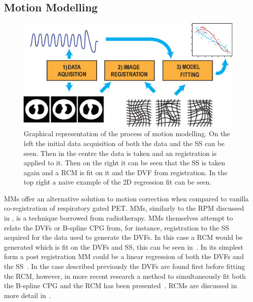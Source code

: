         \subsection{Motion Modelling} \label{sec:motion_modelling}
            \begin{figure}
                \centering
                        
                \includegraphics[width=1.0\linewidth]{figures/background_motion_model.png}
                        
                \captionsetup{singlelinecheck=false, justification=raggedright}
                \caption{Graphical representation of the process of motion modelling. On the left the initial data acquisition of both the data and the \gls{SS} can be seen. Then in the centre the data is taken and an registration is applied to it. Then on the right it can be seen that the \gls{SS} is taken again and a \gls{RCM} is fit on it and the \gls{DVF} from registration. In the top right a naive example of the \gls{2D} regression fit can be seen.} \label{fig:motion_modelling_motion_model}
            \end{figure}
            
            \glspl{MM} offer an alternative solution to motion correction when compared to vanilla co-registration of respiratory gated \gls{PET}. \glspl{MM}, similarly to the \gls{RPM} discussed in , is a technique borrowed from radiotherapy. \glspl{MM} themselves attempt to relate the \glspl{DVF} or B-spline \gls{CPG} from, for instance, registration to the \gls{SS} acquired for the data used to generate the \glspl{DVF}. In this case a \gls*{RCM} would be generated which is fit on the \glspl{DVF} and \gls{SS}, this can be seen in~. In its simplest form a post registration \gls{MM} could be a linear regression of both the \glspl{DVF} and the \gls{SS}~\parencite{Kim1997MotionModel}. In the case described previously the \glspl{DVF} are found first before fitting the \gls{RCM}, however, in more recent research a method to simultaneously fit both the B-spline \gls{CPG} and the \gls{RCM} has been presented~\parencite{McClelland2013, McClelland2006, McClelland2014, McClelland2017}. \glspl{RCM} are discussed in more detail in~.
            
